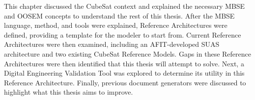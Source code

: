 This chapter discussed the CubeSat context and explained the necessary MBSE and OOSEM concepts to understand the rest of this thesis. After the MBSE language, method, and tools were explained, Reference Architectures were defined, providing a template for the modeler to start from. Current Reference Architectures were then examined, including an AFIT-developed SUAS architecture and two existing CubeSat Reference Models. Gaps in these Reference Architectures were then identified that this thesis will attempt to solve. Next, a Digital Engineering Validation Tool was explored to determine its utility in this Reference Architecture. Finally, previous document generators were discussed to highlight what this thesis aims to improve. 